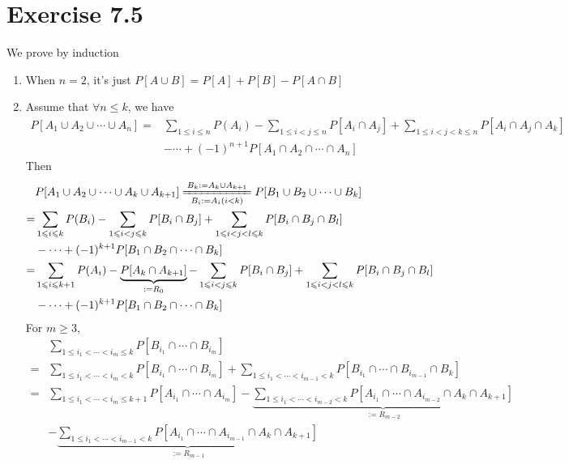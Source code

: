 \documentclass[a4paper,12pt,titlepage]{article}
\begin{document}
\section*{Exercise 7.5}
We prove by induction
\begin{enumerate}
\item When $n=2$, it's just $P[A\cup B]=P[A]+P[B]-P[A\cap B]$

\item Assume that $\forall n\leqslant k$, we have 
\begin{align*}
P[A_1\cup A_2\cup\cdots\cup A_n]=&\sum\limits_{1\leqslant i\leqslant n}P(A_i)-\sum\limits_{1\leqslant i<j\leqslant n}P[A_i\cap A_j]+\sum\limits_{1\leqslant i<j<k\leqslant n}P[A_i\cap A_j\cap A_k]\\
&-\cdots+(-1)^{n+1}P[A_1\cap A_2\cap\cdots\cap A_n]
\end{align*}
Then 
\begin{align*}
&P[A_1\cup A_2\cup\cdots\cup A_k\cup A_{k+1}]\xlongequal[B_i:=A_i(i<k)]{B_k:=A_k\cup A_{k+1}}P[B_1\cup B_2\cup\cdots\cup B_k]\\
=&\sum\limits_{1\leqslant i\leqslant k}P(B_i)-\sum\limits_{1\leqslant i<j\leqslant k}P[B_i\cap B_j]+\sum\limits_{1\leqslant i<j<l\leqslant k}P[B_i\cap B_j\cap B_l]\\
&-\cdots+(-1)^{k+1}P[B_1\cap B_2\cap\cdots\cap B_k]\\
=&\sum\limits_{1\leqslant i\leqslant k+1}P(A_i)-\underbrace{P[A_k\cap A_{k+1}]}_{:=R_{0}}-\sum\limits_{1\leqslant i<j\leqslant k}P[B_i\cap B_j]+\sum\limits_{1\leqslant i<j<l\leqslant k}P[B_i\cap B_j\cap B_l]\\
&-\cdots+(-1)^{k+1}P[B_1\cap B_2\cap\cdots\cap B_k]\\
\end{align*}
For $m\geqslant3$,
\begin{align*}
&\sum\limits_{1\leqslant i_1<\cdots<i_m\leqslant k}P[B_{i_1}\cap \cdots\cap B_{i_m}]\\
=&\sum\limits_{1\leqslant i_1<\cdots<i_m< k}P[B_{i_1}\cap \cdots\cap B_{i_m}]+\sum\limits_{1\leqslant i_1<\cdots<i_{m-1}< k}P[B_{i_1}\cap \cdots\cap B_{i_{m-1}}\cap B_k]\\
=&\sum\limits_{1\leqslant i_1<\cdots<i_m\leqslant k+1}P[A_{i_1}\cap \cdots\cap A_{i_m}]-\underbrace{\sum\limits_{1\leqslant i_1<\cdots<i_{m-2}<k}P[A_{i_1}\cap \cdots\cap A_{i_{m-2}}\cap A_k\cap A_{k+1}]}_{:=R_{m-2}}\\&-\underbrace{\sum\limits_{1\leqslant i_1<\cdots<i_{m-1}< k}P[A_{i_1}\cap \cdots\cap A_{i_{m-1}}\cap A_k\cap A_{k+1}]}_{:=R_{m-1}}

\end{align*}
\end{enumerate}
\end{document}
